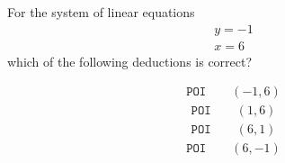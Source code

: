 \documentclass{webquiz}
\begin{document}
\begin{question} %
For the system of linear equations
\begin{gather*}
y=-1\\
x=6
\end{gather*}
which of the following deductions is correct?
\begin{choice}[columns=1] %
\incorrect
\begin{gather*} 
\texttt{POI} \qquad (-1,6)
\end{gather*}
\incorrect
\begin{gather*} 
\texttt{POI} \qquad  (1,6)
\end{gather*}
\incorrect
\begin{gather*} 
\texttt{POI} \qquad (6,1)
\end{gather*}
\correct
\begin{gather*} 
\texttt{POI} \qquad (6,-1)
\end{gather*}
\end{choice}
\end{question}
\end{document}
